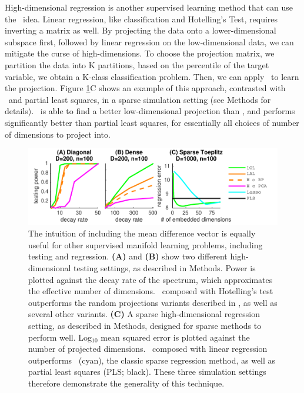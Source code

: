 \documentclass[11pt]{extarticle}
\begin{document}
High-dimensional  regression is another supervised learning method that can use the \Lol~idea. Linear regression, like classification and Hotelling's Test, requires inverting a  matrix as well.  By projecting the data onto a lower-dimensional subspace first, followed by linear regression on the low-dimensional data, we can mitigate the curse of high-dimensions.  To choose the projection matrix, we partition the data into K partitions, based on the percentile of the target variable, we obtain a K-class classification problem.  Then, we can apply \Lol~to learn the projection.  Figure \ref{f:generalizations}{\color{magenta}C} shows an example of this approach, contrasted with \Lasso~and partial least squares, in a sparse simulation setting (see Methods for details). \Lol~is able to find a better low-dimensional projection than \Lasso, and performs significantly better than partial least squares, for essentially all choices of number of dimensions to project into.




\begin{figure}
\centering
\includegraphics[width=1\linewidth]{regression_power}
\caption{
The intuition of including the mean difference vector is equally useful for other supervised manifold learning problems, including testing and regression.
\textbf{(A)} and \textbf{(B)} show two different high-dimensional testing settings, as described in Methods.  Power is plotted against the decay rate of the spectrum, which approximates the effective number of dimensions.  \Lol~composed with Hotelling's test outperforms the random projections variants described in \cite{Lopes2011a}, as well as several other variants.
\textbf{(C)} A sparse high-dimensional regression setting, as described in Methods, designed for sparse methods to perform well.  Log$_{10}$ mean squared error is plotted against the number of projected dimensions.
\Lol~composed with linear regression outperforms ~(cyan), the classic sparse regression method, as well as partial least squares (PLS; black).
These three simulation settings therefore demonstrate the generality of this technique.
}
\label{f:generalizations}
\end{figure}
\end{document}
